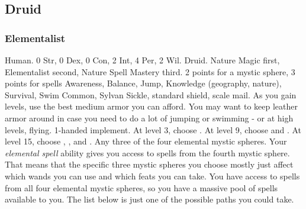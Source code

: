     \subsection{Druid}

        \subsubsection{Elementalist}
             Human.
             0 Str, 0 Dex, 0 Con, 2 Int, 4 Per, 2 Wil.
             Druid.
             Nature Magic first, Elementalist second, Nature Spell Mastery third.
             2 points for a mystic sphere, 3 points for spells
             Awareness, Balance, Jump, Knowledge (geography, nature), Survival, Swim
             Common, Sylvan
             Sickle, standard shield, scale mail. As you gain levels, use the best medium armor you can afford.
            You may want to keep leather armor around in case you need to do a lot of jumping or swimming - or at high levels, flying.
             1-handed implement.
                At level 3, choose .
                At level 9, choose  and .
                At level 15, choose , , and .
             Any three of the four elemental mystic spheres.
            Your \textit{elemental spell} ability gives you access to spells from the fourth mystic sphere.
            That means that the specific three mystic spheres you choose mostly just affect which wands you can use and which feats you can take.
            You have access to spells from all four elemental mystic spheres, so you have a massive pool of spells available to you.
            The list below is just one of the possible paths you could take.
